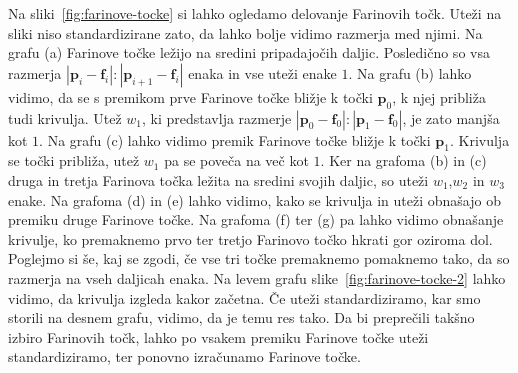 \documentclass[isrm2, tisk]{fmfdelo}
\newcommand{\p}{\mathbf{p}}
\begin{document}
    Na sliki~\ref{fig:farinove-tocke} si lahko ogledamo delovanje Farinovih točk.
    Uteži na sliki niso standardizirane zato, da lahko bolje vidimo razmerja med njimi.
    Na grafu (a) Farinove točke ležijo na sredini pripadajočih daljic.
    Posledično so vsa razmerja $|\p_i-\mathbf{f}_i|:|\p_{i+1}-\mathbf{f}_i|$ enaka in vse uteži enake $1$.
    Na grafu (b) lahko vidimo, da se s premikom prve Farinove točke bližje k točki $\p_0$, k njej približa tudi krivulja.
    Utež $w_1$, ki predstavlja razmerje $|\p_0-\mathbf{f}_0|:|\p_{1}-\mathbf{f}_0|$, je zato manjša kot $1$.
    Na grafu (c) lahko vidimo premik Farinove točke bližje k točki $\p_1$.
    Krivulja se točki približa, utež $w_1$ pa se poveča na več kot $1$.
    Ker na grafoma (b) in (c) druga in tretja Farinova točka ležita na sredini svojih daljic, so uteži $w_1$,$w_2$ in $w_3$ enake.
    Na grafoma (d) in (e) lahko vidimo, kako se krivulja in uteži obnašajo ob premiku druge Farinove točke.
    Na grafoma (f) ter (g) pa lahko vidimo obnašanje krivulje, ko premaknemo prvo ter tretjo Farinovo točko hkrati gor oziroma dol.
    Poglejmo si še, kaj se zgodi, če vse tri točke premaknemo pomaknemo tako, da so razmerja na vseh daljicah enaka.
    Na levem grafu slike~\ref{fig:farinove-tocke-2} lahko vidimo, da krivulja izgleda kakor začetna.
    Če uteži standardiziramo, kar smo storili na desnem grafu, vidimo, da je temu res tako.
    Da bi preprečili takšno izbiro Farinovih točk, lahko po vsakem premiku Farinove točke uteži standardiziramo, ter ponovno izračunamo Farinove točke.
\end{document}
